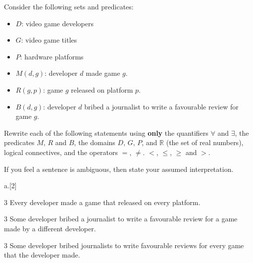 \def\StartsWith#1#2{\textit{Starts}({#1},{#2})}

\item[9] Consider the following sets and predicates: 
  \begin{itemize}
  \item $D$: video game developers
  \item $G$: video game titles
  \item $P$: hardware platforms
  \item $M(d, g)$: developer $d$ made game $g$.
  \item $R(g, p)$: game $g$ released on platform $p$.
  \item $B(d, g)$: developer $d$ bribed a journalist to write a favourable review for game $g$.
  \end{itemize}

  Rewrite each of  the following statements using \textbf{only}  the quantifiers $\forall$
  and $\exists$, the predicates $M$, $R$ and $B$, the domains $D$, $G$, $P$, and $\mathbb{R}$ (the set of real numbers),
  logical connectives, and the operators $=$, $\neq$. $<$, $\le$, $\ge$ and $>$.
  
  If you feel a  sentence is ambiguous, then state your assumed interpretation.
  \begin{question}{a.}[2]

  \item[3] Every developer made a game that released on every platform.
   
   \vspace{2.0in}
   
  \item[3] Some developer bribed a journalist to write a favourable review for a game made by a different developer.
  
  \vspace{2.0in}
   
  \item[3] Some developer bribed journalists to write favourable reviews for every game that the developer made.
  
  \vspace{2.0in}

  \end{question}

